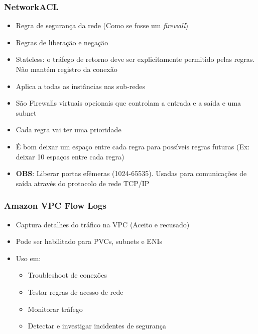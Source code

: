 \begin{frame}[allowframebreaks]
	\frametitle{NetworkACL}
	\begin{itemize}
		\item Regra de segurança da rede (Como se fosse um \textit{firewall})
		\item Regras de liberação e negação
		\item Stateless: o tráfego de retorno deve ser explicitamente permitido pelas regras. Não mantém registro da conexão
		\item Aplica a todas as instâncias nas sub-redes
		\item São Firewalls virtuais opcionais que controlam a entrada e a saída e uma subnet
		\framebreak
		\item Cada regra vai ter uma prioridade
		\item É bom deixar um espaço entre cada regra para possíveis regras futuras (Ex: deixar 10 espaços entre cada regra)
		\item \textbf{OBS}: Liberar portas efêmeras (1024-65535). Usadas para comunicações de saída através do protocolo de rede TCP/IP
	\end{itemize}
\end{frame}

\begin{frame}
	\frametitle{Amazon VPC Flow Logs}
	\begin{itemize}
		\item Captura detalhes do tráfico na VPC (Aceito e recusado)
		\item Pode ser habilitado para PVCs, subnets e ENIs
		\item Uso em:
			\begin{itemize}
				\item Troubleshoot de conexões
				\item Testar regras de acesso de rede
				\item Monitorar tráfego
				\item Detectar e investigar incidentes de segurança
			\end{itemize}
	\end{itemize}
\end{frame}

